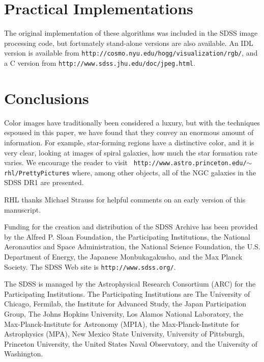 \documentclass[preprint]{aastex}		%
\begin{document}
\section{Practical Implementations}

The original implementation of these algorithms was included in the
SDSS image processing code, but fortunately stand-alone versions are
also available.  An IDL version is available from
\texttt{http://cosmo.nyu.edu/hogg/visualization/rgb/}, and a
C version from\hfil\break
\texttt{http://www.sdss.jhu.edu/doc/jpeg.html}.
\section{Conclusions}

Color images have traditionally been considered a luxury, but with the
techniques espoused in this paper, we have found that they convey an
enormous amount of information.  For example, star-forming regions
have a distinctive color, and it is very clear, looking at images of
spiral galaxies, how much the star formation rate varies. We encourage
the reader to visit\hfil\break~\qquad
\texttt{http://www.astro.princeton.edu/$\sim$rhl/PrettyPictures}
\hfil\break
where,
among other objects, all of the NGC galaxies in the SDSS DR1 \citep{DR1}
are presented.

\vskip1cm
RHL thanks Michael Strauss for helpful comments on an early version
of this manuscript.

Funding for the creation and distribution of the SDSS Archive has been
provided by the Alfred P. Sloan Foundation, the Participating
Institutions, the National Aeronautics and Space Administration, the
National Science Foundation, the U.S. Department of Energy, the
Japanese Monbukagakusho, and the Max Planck Society.  The SDSS Web
site is \texttt{http://www.sdss.org/}.

The SDSS is managed by the Astrophysical Research Consortium (ARC) for
the Participating Institutions.  The Participating Institutions are
The University of Chicago, Fermilab, the Institute for Advanced Study,
the Japan Participation Group, The Johns Hopkins University, Los
Alamos National Laboratory, the Max-Planck-Institute for Astronomy
(MPIA), the Max-Planck-Institute for Astrophysics (MPA), New Mexico
State University, University of Pittsburgh, Princeton University, the
United States Naval Observatory, and the University of Washington.
\end{document}
